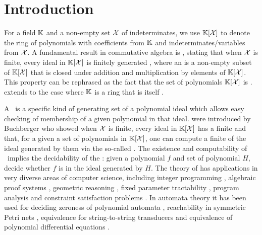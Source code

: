 \section{Introduction}
\label{sec:intro}

\AP For a field $\mathbb{K}$ and a non-empty set $\mathcal{X}$ of indeterminates, we use
$\mathbb{K}[\mathcal{X}]$ to denote the ring of polynomials with coefficients from $\mathbb{K}$
and indeterminates/variables from $\mathcal{X}$. A fundamental result in commutative
algebra is , stating that when $\mathcal{X}$ is finite,
every ideal in $\mathbb{K}[\mathcal{X}]$ is finitely generated \cite{HILB1890}, where an
 is a non-empty subset of $\mathbb{K}[\mathcal{X}]$ that is closed under
addition and multiplication by elements of $\mathbb{K}[\mathcal{X}]$. This property can
be rephrased as the fact that the set of polynomials $\mathbb{K}[\mathcal{X}]$ is
.  extends to the case where $\mathbb{K}$
is a ring that is itself  \cite[Theorem 4.1]{Lang02}.

\AP A \Grb\ is a specific kind of generating set of a polynomial ideal
which allows easy checking of membership of a given polynomial in that ideal.
 were introduced by Buchberger who showed when $\mathcal{X}$ is
finite, every ideal in $\mathbb{K}[\mathcal{X}]$ has a finite  and
that, for a given a set of polynomials in $\mathbb{K}[\mathcal{X}]$, one can compute a
finite  of the ideal generated by them via the so-called
 \cite{BUCH76}. The
existence and computability of \Grbs\ implies the decidability of the
: given a polynomial $f$ and set of polynomial
$H$, decide whether $f$ is in the ideal generated by $H$. The theory of
 has applications in very diverse areas of computer
science, including integer programming \cite{Sturmfels96}, algebraic proof
systems \cite{algProof}, geometric reasoning \cite{Cox2015chGeom}, fixed
parameter tractability \cite{ACDM22}, program analysis \cite{SSM04} and
constraint satisfaction problems \cite{Mas21}.
In automata theory it has been used for deciding zeroness of polynomial
automata \cite{BEDUSHWO17}, reachability in symmetric Petri nets \cite{MAME82},
equivalence for string-to-string transducers \cite{HONKALA00} and equivalence
of polynomial differential equations \cite{CLEMENTE24}. 

